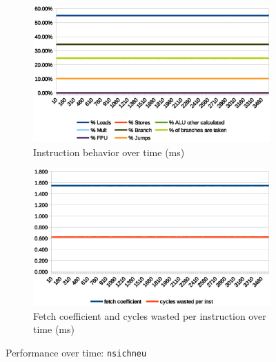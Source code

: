 \documentclass[../bachelor_paper.tex]{subfiles}
\begin{document}
\begin{figure}
    \begin{subfigure}{0.45\textwidth}
        \includegraphics[width=\textwidth]{img/graph/embench/nsichneu_inst.eps}
        \caption{Instruction behavior over time (ms)}
    \end{subfigure}
    \begin{subfigure}{0.45\textwidth}
        \includegraphics[width=\textwidth]{img/graph/embench/nsichneu_fetch_waste.eps}
        \caption{Fetch coefficient and cycles wasted per instruction over time (ms)}
    \end{subfigure}
    \caption{Performance over time: \texttt{nsichneu}}
\end{figure}
\end{document}
